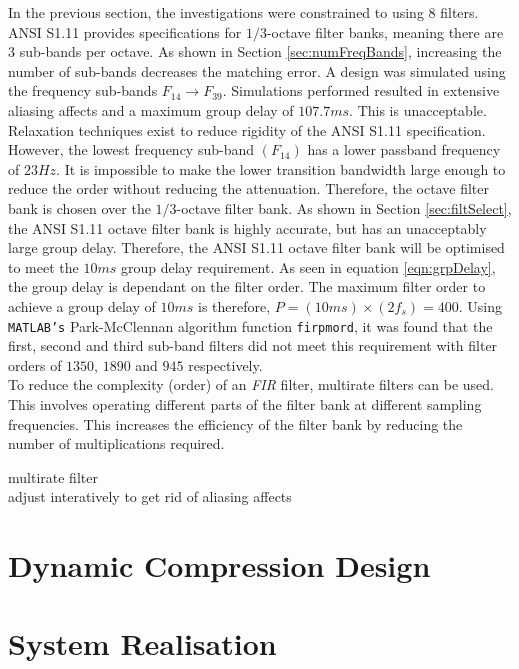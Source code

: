\documentclass[12pt, onecolumn]{article}
\begin{document}
\noindent In the previous section, the investigations were constrained to using 8 filters. ANSI S1.11 provides specifications for $1/3$-octave filter banks, meaning there are $3$ sub-bands per octave. As shown in Section \ref{sec:numFreqBands}, increasing the number of sub-bands decreases the matching error. A design was simulated using the frequency sub-bands $F_{14} \rightarrow F_{39}$. Simulations performed resulted in extensive aliasing affects and a maximum group delay of $107.7ms$. This is unacceptable. Relaxation techniques exist to reduce rigidity of the ANSI S1.11 specification. However, the lowest frequency sub-band $(F_{14})$ has a lower passband frequency of $23Hz$. It is impossible to make the lower transition bandwidth large enough to reduce the order without reducing the attenuation. Therefore, the octave filter bank is chosen over the $1/3$-octave filter bank. As shown in Section \ref{sec:filtSelect}, the ANSI S1.11 octave filter bank is highly accurate, but has an unacceptably large group delay. Therefore, the ANSI S1.11 octave filter bank will be optimised to meet the $10ms$ group delay requirement. As seen in equation \ref{eqn:grpDelay}, the group delay is dependant on the filter order. The maximum filter order to achieve a group delay of $10ms$ is therefore, $P = (10ms)\times (2f_s) = 400$. Using \texttt{MATLAB's} Park-McClennan algorithm function \texttt{firpmord}, it was found that the first, second and third sub-band filters did not meet this requirement with filter orders of $1350$, $1890$ and $945$ respectively.\\
\newline
\noindent To reduce the complexity (order) of an \textit{FIR} filter, multirate filters can be used. This involves operating different parts of the filter bank at different sampling frequencies. This increases the efficiency of the filter bank by reducing the number of multiplications required.



multirate filter\\
adjust interatively to get rid of aliasing affects


\section{Dynamic Compression Design}

\noindent 

\section{System Realisation}
\end{document}
